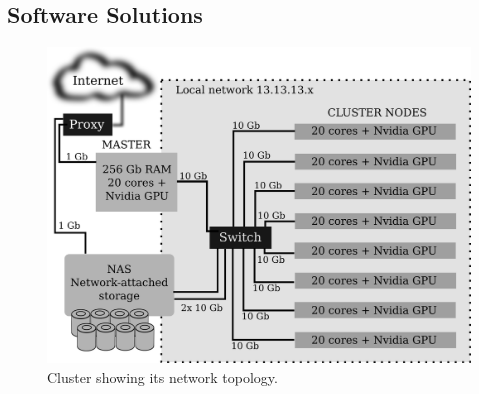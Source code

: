 \documentclass[twoside,a4paper,12pt,english]{inac19}
\begin{document}
\subsection{Software Solutions}
\label{sub:ssol}




\begin{figure}[h] %
  \centering\includegraphics[scale=0.7]{images/cluster-rede.png}
  \caption{Cluster showing its network topology.}
  \label{fig:esquema-cluster}
\end{figure}
\end{document}
